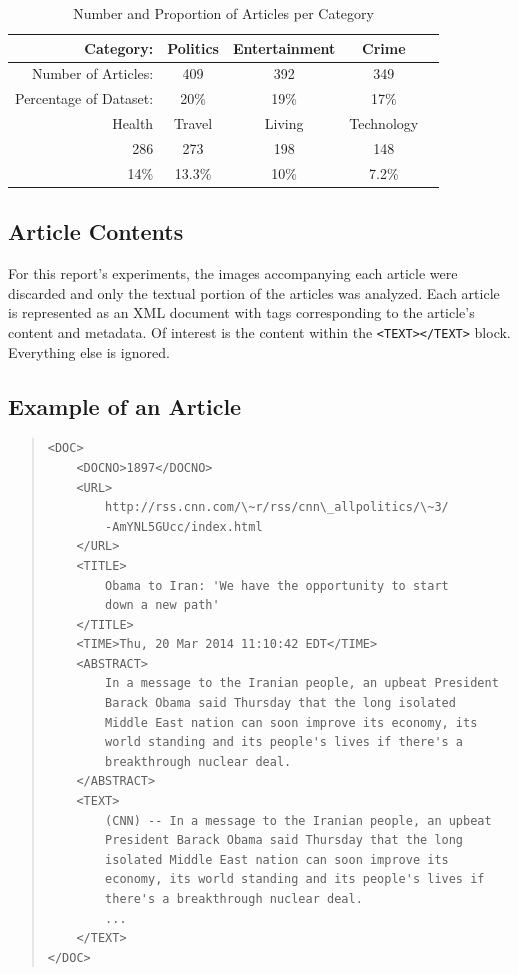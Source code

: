\documentclass[11pt]{article}
\begin{document}
\begin{table}[h]
	\centering
	\begin{tabular}{ r c c c c  }
		\hline
	Category: &              Politics & Entertainment & Crime & \\ \hline
	Number of Articles: &    409 &      392 &           349 & \\ \hline
	Percentage of Dataset: & 20\% &    19\% &           17\% & \\
	  \hline
	  \hline
	   Health & Travel & Living & Technology \\ \hline
	   286    & 273    & 198    & 148 \\ \hline
	   14\%   & 13.3\% & 10\%   & 7.2\% \\
	\hline
	\end{tabular}
	
	\caption{Number and Proportion of Articles per Category}
	\label{table:categories}
\end{table}


\subsection{Article Contents}

For this report's experiments, the images accompanying each article were discarded and only the textual portion of the articles was analyzed.
Each article is represented as an XML document with tags corresponding to the article's content and metadata.
Of interest is the content within the \texttt{<TEXT></TEXT>} block.
Everything else is ignored.

\pagebreak
\subsection{Example of an Article}

\small 
\begin{quote} \label{samplearticle}
\begin{verbatim}
<DOC>
    <DOCNO>1897</DOCNO>
    <URL>
        http://rss.cnn.com/\~r/rss/cnn\_allpolitics/\~3/
        -AmYNL5GUcc/index.html
    </URL>
    <TITLE>
        Obama to Iran: 'We have the opportunity to start
        down a new path'
    </TITLE>
    <TIME>Thu, 20 Mar 2014 11:10:42 EDT</TIME>
    <ABSTRACT>
        In a message to the Iranian people, an upbeat President
        Barack Obama said Thursday that the long isolated
        Middle East nation can soon improve its economy, its
        world standing and its people's lives if there's a
        breakthrough nuclear deal.
    </ABSTRACT>
    <TEXT>
        (CNN) -- In a message to the Iranian people, an upbeat
        President Barack Obama said Thursday that the long
        isolated Middle East nation can soon improve its
        economy, its world standing and its people's lives if
        there's a breakthrough nuclear deal.
        ...
    </TEXT>
</DOC>
\end{verbatim}
\end{quote}
\normalsize
\end{document}
